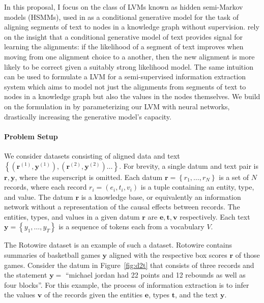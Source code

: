 \documentclass[12pt]{article}
\newcommand\set[1]{\left\{#1\right\}}
\newcommand{\be}{\mathbf{e}}
\newcommand{\br}{\mathbf{r}}
\newcommand{\bt}{\mathbf{t}}
\newcommand{\bv}{\mathbf{v}}
\newcommand{\by}{\mathbf{y}}
\begin{document}
In this proposal, I focus on the class of LVMs known as hidden semi-Markov models (HSMMs),
used in \citet{liang2009semalign} as a conditional generative model for the
task of aligning segments of text to nodes in a knowledge graph without supervision.
\citet{liang2009semalign} rely on the insight that a conditional generative model of text
provides signal for learning the alignments:
if the likelihood of a segment of text improves when moving from
one alignment choice to a another,
then the new alignment is more likely to be correct given a suitably strong likelihood model.
The same intuition can be used to formulate a LVM for a semi-supervised information extraction system
which aims to model not just the alignments from segments of text to nodes in a knowledge graph
but also the values in the nodes themselves.
We build on the formulation in \citet{liang2009semalign} by parameterizing our LVM
with neural networks, drastically increasing the generative model's capacity.

\paragraph{Problem Setup}
We consider datasets consisting of aligned data and text
$\set{(\br^{(1)}, \by^{(1)}),(\br^{(2)},\by^{(2)})\ldots}$.
For brevity, a single datum and text pair is $\br,\by$, where the superscript is omitted.
Each datum $\br = \set{r_1,\ldots,r_N}$ is a set of $N$ records, where each record $r_i = (e_i, t_i, v_i)$
is a tuple containing an entity, type, and value.
The datum $\br$ is a knowledge base, or equivalently an information network
without a representation of the causal effects between records.
The entities, types, and values in a given datum $\br$ are $\be,\bt,\bv$ respectively.
Each text $\by = \set{y_1,\ldots,y_T}$ is a sequence of tokens each from a vocabulary $V$.

The Rotowire dataset \citep{wiseman2017d2t} is an example of such a dataset.
Rotowire contains summaries of basketball games $\by$ aligned with the respective
box scores $\br$ of those games.
Consider the datum in Figure~\ref{fig:d2t} that consists of three records
and the statement $\by = $ ``michael jordan had 22 points and 12 rebounds as well as four blocks''.
For this example, the process of information extraction is to infer 
the values $\bv$ of the records given the entities $\be$, types $\bt$, and the text $\by$.
\end{document}
